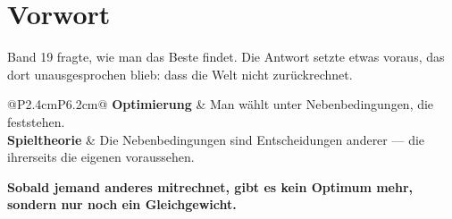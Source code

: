 \chapter*{Vorwort}

\begin{merksatz}
Band 19 fragte, wie man das Beste findet. Die Antwort setzte etwas voraus, das dort unausgesprochen blieb: dass die Welt nicht zurückrechnet.

\begin{center}
{\small
\renewcommand{\arraystretch}{1.5}
\begin{tabular}{@{}P{2.4cm}P{6.2cm}@{}}
\toprule
\textbf{Optimierung} & Man wählt unter Nebenbedingungen, die feststehen.\\
\textbf{Spieltheorie} & Die Nebenbedingungen sind Entscheidungen anderer --- die ihrerseits die eigenen voraussehen.\\
\bottomrule
\end{tabular}}
\end{center}

\begin{center}
\begin{minipage}{0.9\textwidth}
\textbf{Sobald jemand anderes mitrechnet, gibt es kein Optimum mehr, sondern nur noch ein Gleichgewicht.}
\end{minipage}
\end{center}

\begin{center}
\begin{minipage}{0.88\textwidth}
\end{minipage}
\end{center}
\end{merksatz}

